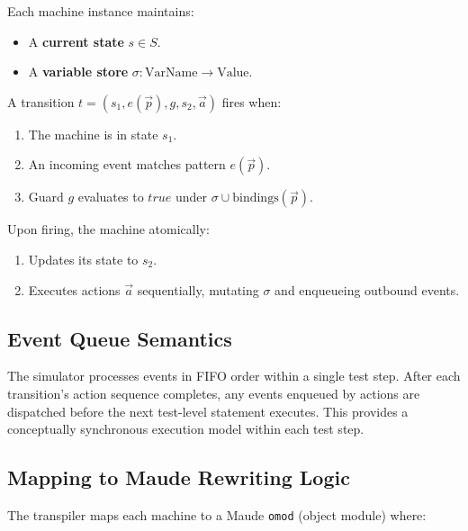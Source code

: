 \documentclass[11pt,letterpaper]{article}
\begin{document}
Each machine instance maintains:
\begin{itemize}[leftmargin=1.5em]
  \item A \textbf{current state} $s \in S$.
  \item A \textbf{variable store} $\sigma : \text{VarName} \to
        \text{Value}$.
\end{itemize}

A transition $t = (s_1, e(\vec{p}), g, s_2, \vec{a})$ fires when:
\begin{enumerate}
  \item The machine is in state $s_1$.
  \item An incoming event matches pattern $e(\vec{p})$.
  \item Guard $g$ evaluates to $\mathit{true}$ under $\sigma \cup
        \text{bindings}(\vec{p})$.
\end{enumerate}

Upon firing, the machine atomically:
\begin{enumerate}
  \item Updates its state to $s_2$.
  \item Executes actions $\vec{a}$ sequentially, mutating $\sigma$ and
        enqueueing outbound events.
\end{enumerate}

\subsection{Event Queue Semantics}

The simulator processes events in FIFO order within a single test step.
After each transition's action sequence completes, any events enqueued
by actions are dispatched before the next test-level statement executes.
This provides a conceptually synchronous execution model within each
test step.

\subsection{Mapping to Maude Rewriting Logic}

The transpiler maps each machine to a Maude \texttt{omod} (object
module) where:
\end{document}
